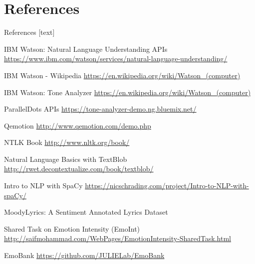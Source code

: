 \documentclass[xcolor=dvipsnames]{beamer}
\begin{document}

\section{References}
\begin{frame}[allowframebreaks]{References}
[text]
 \begin{thebibliography}{99} %
 IBM Watson: Natural Language Understanding APIs
\footnotesize \url{https://www.ibm.com/watson/services/natural-language-understanding/}

 IBM Watson - Wikipedia
\footnotesize \url{https://en.wikipedia.org/wiki/Watson_(computer)}

 IBM Watson: Tone Analyzer
\footnotesize\url{https://en.wikipedia.org/wiki/Watson_(computer)}

 ParallelDots APIs
\footnotesize \url{https://tone-analyzer-demo.ng.bluemix.net/}

 Qemotion
\footnotesize \url{http://www.qemotion.com/demo.php}

 NTLK Book
\footnotesize \url{http://www.nltk.org/book/}

 Natural Language Basics with TextBlob
\footnotesize\url{http://rwet.decontextualize.com/book/textblob/}

 Intro to NLP with SpaCy
\footnotesize\url{https://nicschrading.com/project/Intro-to-NLP-with-spaCy/}

 MoodyLyrics: A Sentiment Annotated Lyrics Dataset

 Shared Task on Emotion Intensity (EmoInt)
\footnotesize\url{http://saifmohammad.com/WebPages/EmotionIntensity-SharedTask.html}

 EmoBank
\footnotesize\url{https://github.com/JULIELab/EmoBank}

\end{thebibliography}

\end{frame}

\end{document}
